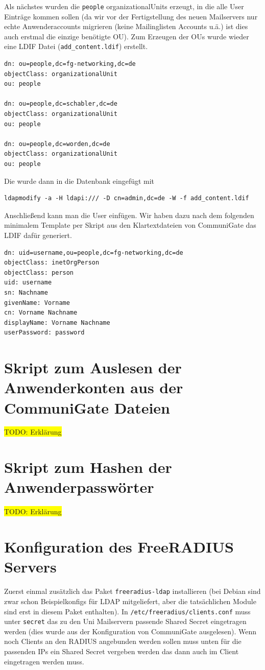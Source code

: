 \documentclass[11pt,a4paper,titlepage=firstiscover,headsepline,bibtotoc]{scrartcl} %
\newcommand{\hilight}[1]{\colorbox{yellow}{#1}} %
\begin{document}
Als nächstes wurden die \texttt{people} organizationalUnits erzeugt, in die alle User Einträge kommen sollen (da wir vor der Fertigstellung des neuen Mailservers nur echte Anwenderaccounts migrieren (keine Mailinglisten Accounts u.ä.) ist dies auch erstmal die einzige benötigte OU). Zum Erzeugen der OUs wurde wieder eine LDIF Datei (\texttt{add\_content.ldif}) erstellt.
\begin{lstlisting}
dn: ou=people,dc=fg-networking,dc=de
objectClass: organizationalUnit
ou: people

dn: ou=people,dc=schabler,dc=de
objectClass: organizationalUnit
ou: people

dn: ou=people,dc=worden,dc=de
objectClass: organizationalUnit
ou: people
\end{lstlisting}
Die wurde dann in die Datenbank eingefügt mit
\begin{lstlisting}
ldapmodify -a -H ldapi:/// -D cn=admin,dc=de -W -f add_content.ldif
\end{lstlisting}
Anschließend kann man die User einfügen. Wir haben dazu nach dem folgenden minimalem Template per Skript aus den Klartextdateien von CommuniGate das LDIF dafür generiert.
\begin{lstlisting}
dn: uid=username,ou=people,dc=fg-networking,dc=de
objectClass: inetOrgPerson
objectClass: person
uid: username
sn: Nachname
givenName: Vorname
cn: Vorname Nachname
displayName: Vorname Nachname
userPassword: password
\end{lstlisting}

\newpage
\section{Skript zum Auslesen der Anwenderkonten aus der CommuniGate Dateien}\label{sec:SkriptA}

\hilight{TODO: Erklärung}

\newpage
\section{Skript zum Hashen der Anwenderpasswörter}\label{sec:SkriptB}

\hilight{TODO: Erklärung}

\newpage
\section{Konfiguration des FreeRADIUS Servers}\label{sec:RADIUS-Konfig}
Zuerst einmal zusätzlich das Paket \texttt{freeradius-ldap} installieren (bei Debian sind zwar schon Beispielkonfigs für LDAP mitgeliefert, aber die tatsächlichen Module sind erst in diesem Paket enthalten). In \texttt{/etc/freeradius/clients.conf} muss unter \texttt{secret} das zu den Uni Mailservern passende Shared Secret eingetragen werden (dies wurde aus der Konfiguration von CommuniGate ausgelesen). Wenn noch Clients an den RADIUS angebunden werden sollen muss unten für die passenden IPs ein Shared Secret vergeben werden das dann auch im Client eingetragen werden muss.
\end{document}
